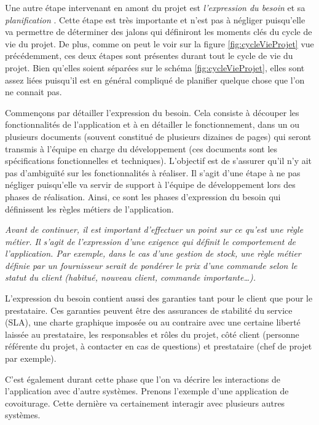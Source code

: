Une autre étape intervenant en amont du projet est \emph{l'expression du besoin} et sa \emph{planification} . Cette étape est très importante et n'est pas à négliger puisqu'elle va permettre de déterminer des jalons qui définiront les moments clés du cycle de vie du projet. De plus, comme on peut le voir sur la figure \ref{fig:cycleVieProjet} vue précédemment, ces deux étapes sont présentes durant tout le cycle de vie du projet. Bien qu'elles soient séparées sur le schéma \ref{fig:cycleVieProjet}, elles sont assez liées puisqu'il est en général compliqué de planifier quelque chose que l'on ne connait pas.

Commençons par détailler l'expression du besoin. Cela consiste à découper les fonctionnalités de l'application et à en détailler le fonctionnement, dans un ou plusieurs documents (souvent constitué de plusieurs dizaines de pages) qui seront transmis à l'équipe en charge du développement (ces documents sont les spécifications fonctionnelles et techniques). L'objectif est de s'assurer qu'il n'y ait pas d'ambiguïté sur les fonctionnalités à réaliser. Il s'agit d'une étape à ne pas négliger puisqu'elle va servir de support à l'équipe de développement lors des phases de réalisation. Ainsi, ce sont les phases d'expression du besoin qui définissent les règles métiers de l'application. 

{\em
Avant de continuer, il est important d'effectuer un point sur ce qu'est une règle métier. Il s'agit de l'expression d'une exigence qui définit le comportement de l'application. Par exemple, dans le cas d'une gestion de stock, une règle métier définie par un fournisseur serait de pondérer le prix d'une commande selon le statut du client (habitué, nouveau client, commande importante\ldots).
}

L'expression du besoin contient aussi des garanties tant pour le client que pour le prestataire. Ces garanties peuvent être des assurances de stabilité du service (\gls{SLA}), une charte graphique imposée ou au contraire avec une certaine liberté laissée au prestataire, les responsables et rôles du projet, côté client (personne référente du projet, à contacter en cas de questions) et prestataire (chef de projet par exemple).

C'est également durant cette phase que l'on va décrire les interactions de l'application avec d'autre systèmes. Prenons l'exemple d'une application de covoiturage. Cette dernière va certainement interagir avec plusieurs autres systèmes.

